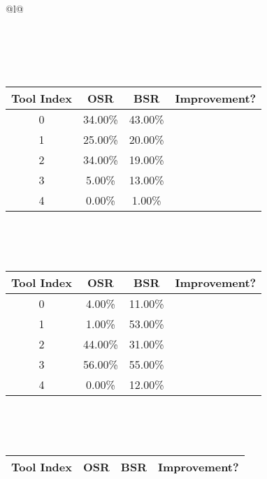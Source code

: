 \begin{longtable}{@{}l@{}}
\begin{minipage}{\textwidth}
\begin{tabular}{|c|c|c|c|}
\end{tabular}
\end{minipage}\\[2ex]
\begin{minipage}{\textwidth}
\centering\vspace{2ex}
\\[0.8ex]
\begin{tabular}{|c|c|c|c|} \hline
\textbf{Tool Index} & \textbf{OSR} & \textbf{ BSR} & \textbf{Improvement?} \\ \hline
0 & 34.00\% & 43.00\% & \textcolor{green}{\ding{51}} \\ \hline
1 & 25.00\% & 20.00\% & \textcolor{red}{\ding{55}} \\ \hline
2 & 34.00\% & 19.00\% & \textcolor{red}{\ding{55}} \\ \hline
3 & 5.00\% & 13.00\% & \textcolor{green}{\ding{51}} \\ \hline
4 & 0.00\% & 1.00\% & \textcolor{green}{\ding{51}} \\ \hline
\end{tabular}
\end{minipage}\\[2ex]
\begin{minipage}{\textwidth}
\centering\vspace{2ex}
\\[0.8ex]
\begin{tabular}{|c|c|c|c|} \hline
\textbf{Tool Index} & \textbf{OSR} & \textbf{ BSR} & \textbf{Improvement?} \\ \hline
0 & 4.00\% & 11.00\% & \textcolor{green}{\ding{51}} \\ \hline
1 & 1.00\% & 53.00\% & \textcolor{green}{\ding{51}} \\ \hline
2 & 44.00\% & 31.00\% & \textcolor{red}{\ding{55}} \\ \hline
3 & 56.00\% & 55.00\% & \textcolor{red}{\ding{55}} \\ \hline
4 & 0.00\% & 12.00\% & \textcolor{green}{\ding{51}} \\ \hline
\end{tabular}
\end{minipage}\\[2ex]
\begin{minipage}{\textwidth}
\centering\vspace{2ex}
\\[0.8ex]
\begin{tabular}{|c|c|c|c|} \hline
\textbf{Tool Index} & \textbf{OSR} & \textbf{ BSR} & \textbf{Improvement?} \\ \hline

\end{tabular}
\end{minipage}
\end{longtable}
